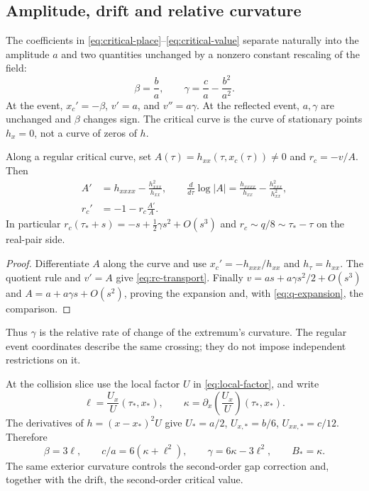 \subsection{Amplitude, drift and relative curvature}
The coefficients in \eqref{eq:critical-place}--\eqref{eq:critical-value}
separate naturally into the amplitude \(a\) and two quantities unchanged
by a nonzero constant rescaling of the field:
\begin{equation}\label{eq:beta-gamma}
 \beta=\frac ba,\qquad \gamma=\frac ca-\frac{b^2}{a^2}.
\end{equation}
At the event, \(x_c'=-\beta\), \(v'=a\), and \(v''=a\gamma\).
At the reflected event, \(a,\gamma\) are unchanged and \(\beta\)
changes sign. The critical curve is the curve of stationary points
\(h_x=0\), not a curve of zeros of \(h\).

\begin{proposition}
\label{prop:curvature-transport}
Along a regular critical curve, set
\(A(\tau)=h_{xx}(\tau,x_c(\tau))\ne0\) and \(r_c=-v/A\).
Then
\begin{align}
 A'&=h_{xxxx}-\frac{h_{xxx}^2}{h_{xx}},\qquad
 \frac{d}{d\tau}\log|A|
 =\frac{h_{xxxx}}{h_{xx}}-\frac{h_{xxx}^2}{h_{xx}^2},
 \label{eq:A-transport}\\
 r_c'&=-1-r_c\frac{A'}{A}.\label{eq:rc-transport}
\end{align}
In particular \(r_c(\tau_*+s)=-s+\tfrac12\gamma s^2+O(s^3)\)
and \(r_c\sim q/8\sim\tau_*-\tau\) on the real-pair side.
\end{proposition}
\begin{proof}
Differentiate \(A\) along the curve and use
\(x_c'=-h_{xxx}/h_{xx}\) and \(h_\tau=h_{xx}\).
The quotient rule and \(v'=A\) give \eqref{eq:rc-transport}.
Finally \(v=as+a\gamma s^2/2+O(s^3)\) and
\(A=a+a\gamma s+O(s^2)\), proving the expansion and, with
\eqref{eq:q-expansion}, the comparison.
\end{proof}

Thus \(\gamma\) is the relative rate of change of the extremum's
curvature. The regular event coordinates describe the same crossing;
they do not impose independent restrictions on it.

At the collision slice use the local factor \(U\) in
\eqref{eq:local-factor}, and write
\begin{equation}\label{eq:ell-kappa}
 \ell=\frac{U_x}{U}(\tau_*,x_*),\qquad
 \kappa=\partial_x\!\left(\frac{U_x}{U}\right)(\tau_*,x_*).
\end{equation}
The derivatives of \(h=(x-x_*)^2U\) give
\(U_*=a/2\), \(U_{x,*}=b/6\), \(U_{xx,*}=c/12\). Therefore
\begin{equation}\label{eq:coefficient-dictionary}
 \boxed{\ \beta=3\ell,\qquad c/a=6(\kappa+\ell^2),\qquad
 \gamma=6\kappa-3\ell^2,\qquad B_*=\kappa.\ }
\end{equation}
The same exterior curvature controls the second-order gap correction
and, together with the drift, the second-order critical value.

